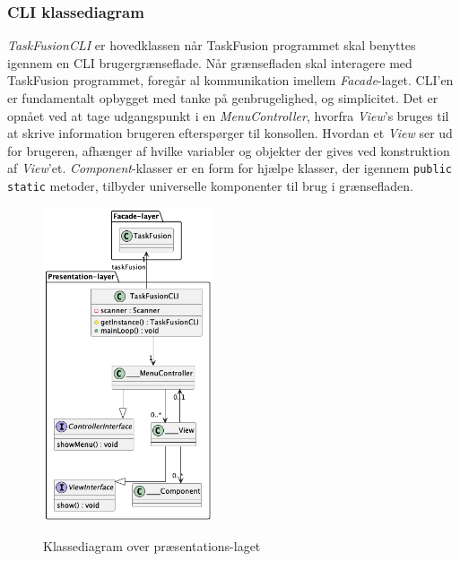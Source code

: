 \subsubsection{CLI klassediagram}
\textit{TaskFusionCLI} er hovedklassen når TaskFusion programmet skal benyttes igennem en CLI brugergrænseflade. Når grænsefladen skal interagere med TaskFusion programmet, foregår al kommunikation imellem \textit{Facade}-laget. CLI'en er fundamentalt opbygget med tanke på genbrugelighed, og simplicitet. Det er opnået ved at tage udgangspunkt i en \textit{MenuController}, hvorfra \textit{View}'s bruges til at skrive information brugeren efterspørger til konsollen. Hvordan et \textit{View} ser ud for brugeren, afhænger af hvilke variabler og objekter der gives ved konstruktion af \textit{View}'et. \textit{Component}-klasser er en form for hjælpe klasser, der igennem \texttt{public static} metoder, tilbyder universelle komponenter til brug i grænsefladen.

\begin{figure}[H]
    \centering
    \caption{Klassediagram over præsentations-laget}
    \includegraphics[width = 5cm, keepaspectratio]{TaskFusion/out/assets/diagrams/class_cli/TaskFusion-CLI.png}
    \label{fig:class_cli}
\end{figure}

